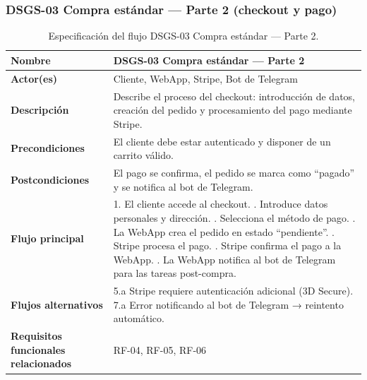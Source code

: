 \subsubsection{DSGS-03 Compra estándar — Parte 2 (checkout y pago)}
\begingroup
\setlength{\intextsep}{0pt}%
\setlength{\abovecaptionskip}{0pt}%
\setlength{\belowcaptionskip}{0pt}%
\begin{table}[H]
\centering
\small
\begin{tabular}{|p{}|p{}|}
\hline
\textbf{Nombre} & DSGS-03 Compra estándar — Parte 2 \\ \hline

\textbf{Actor(es)} & Cliente, WebApp, Stripe, Bot de Telegram \\ \hline

\textbf{Descripción} &
Describe el proceso del checkout: introducción de datos, creación del pedido y procesamiento del pago mediante Stripe. \\ \hline

\textbf{Precondiciones} &
El cliente debe estar autenticado y disponer de un carrito válido. \\ \hline

\textbf{Postcondiciones} &
El pago se confirma, el pedido se marca como “pagado” y se notifica al bot de Telegram. \\ \hline

\textbf{Flujo principal} &
1. El cliente accede al checkout. \newline
2. Introduce datos personales y dirección. \newline
3. Selecciona el método de pago. \newline
4. La WebApp crea el pedido en estado “pendiente”. \newline
5. Stripe procesa el pago. \newline
6. Stripe confirma el pago a la WebApp. \newline
7. La WebApp notifica al bot de Telegram para las tareas post-compra. \\ \hline

\textbf{Flujos alternativos} &
5.a Stripe requiere autenticación adicional (3D Secure). \newline
7.a Error notificando al bot de Telegram → reintento automático. \\ \hline

\textbf{Requisitos funcionales relacionados} & RF-04, RF-05, RF-06 \\ \hline
\end{tabular}
\caption{Especificación del flujo DSGS-03 Compra estándar — Parte 2.}
\end{table}
\endgroup


